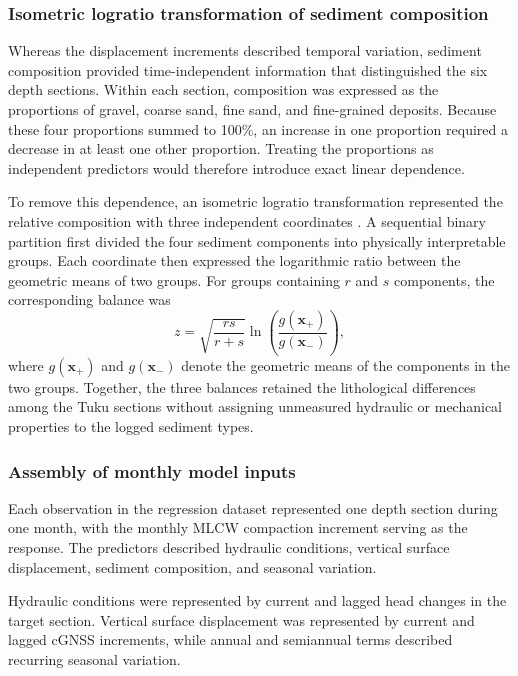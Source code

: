 \subsubsection{Isometric logratio transformation of sediment composition}
\label{subsec:ilr_transformation}

Whereas the displacement increments described temporal variation, sediment composition provided time-independent information that distinguished the six depth sections. Within each section, composition was expressed as the proportions of gravel, coarse sand, fine sand, and fine-grained deposits. Because these four proportions summed to 100\%, an increase in one proportion required a decrease in at least one other proportion. Treating the proportions as independent predictors would therefore introduce exact linear dependence.

To remove this dependence, an isometric logratio transformation represented the relative composition with three independent coordinates \citep{egozcue_isometric_2003, oh_using_2024}. A sequential binary partition first divided the four sediment components into physically interpretable groups. Each coordinate then expressed the logarithmic ratio between the geometric means of two groups. For groups containing $r$ and $s$ components, the corresponding balance was
\begin{equation}
z=\sqrt{\frac{rs}{r+s}}
\ln\left(\frac{g(\boldsymbol{x}_{+})}{g(\boldsymbol{x}_{-})}\right),
\label{eq:ilr_balance}
\end{equation}
where $g(\boldsymbol{x}_{+})$ and $g(\boldsymbol{x}_{-})$ denote the geometric means of the components in the two groups. Together, the three balances retained the lithological differences among the Tuku sections without assigning unmeasured hydraulic or mechanical properties to the logged sediment types.


\subsubsection{Assembly of monthly model inputs}

Each observation in the regression dataset represented one depth section during one month, with the monthly MLCW compaction increment serving as the response. The predictors described hydraulic conditions, vertical surface displacement, sediment composition, and seasonal variation.

Hydraulic conditions were represented by current and lagged head changes in the target section. Vertical surface displacement was represented by current and lagged cGNSS increments, while annual and semiannual terms described recurring seasonal variation.

